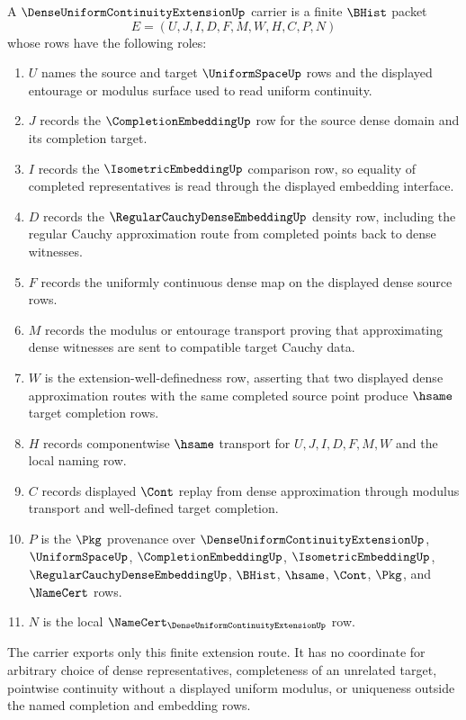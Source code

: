 \begin{definition}
\label{def:dense-uniform-continuity-extension-carrier}
A $\DenseUniformContinuityExtensionUp$ carrier is a finite $\BHist$ packet
$$
E=(U,J,I,D,F,M,W,H,C,P,N)
$$
whose rows have the following roles:
\begin{enumerate}
\item $U$ names the source and target $\UniformSpaceUp$ rows and the displayed entourage or modulus surface used to read uniform continuity.
\item $J$ records the $\CompletionEmbeddingUp$ row for the source dense domain and its completion target.
\item $I$ records the $\IsometricEmbeddingUp$ comparison row, so equality of completed representatives is read through the displayed embedding interface.
\item $D$ records the $\RegularCauchyDenseEmbeddingUp$ density row, including the regular Cauchy approximation route from completed points back to dense witnesses.
\item $F$ records the uniformly continuous dense map on the displayed dense source rows.
\item $M$ records the modulus or entourage transport proving that approximating dense witnesses are sent to compatible target Cauchy data.
\item $W$ is the extension-well-definedness row, asserting that two displayed dense approximation routes with the same completed source point produce $\hsame$ target completion rows.
\item $H$ records componentwise $\hsame$ transport for $U,J,I,D,F,M,W$ and the local naming row.
\item $C$ records displayed $\Cont$ replay from dense approximation through modulus transport and well-defined target completion.
\item $P$ is the $\Pkg$ provenance over $\DenseUniformContinuityExtensionUp$, $\UniformSpaceUp$, $\CompletionEmbeddingUp$, $\IsometricEmbeddingUp$, $\RegularCauchyDenseEmbeddingUp$, $\BHist$, $\hsame$, $\Cont$, $\Pkg$, and $\NameCert$ rows.
\item $N$ is the local $\NameCert_{\DenseUniformContinuityExtensionUp}$ row.
\end{enumerate}
The carrier exports only this finite extension route. It has no coordinate for arbitrary choice of dense representatives, completeness of an unrelated target, pointwise continuity without a displayed uniform modulus, or uniqueness outside the named completion and embedding rows.
\end{definition}

